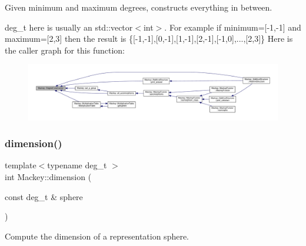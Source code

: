 Given minimum and maximum degrees, constructs everything in between. 

deg\+\_\+t here is usually an std\+::vector$<$int$>$. For example if minimum=\mbox{[}-\/1,-\/1\mbox{]} and maximum=\mbox{[}2,3\mbox{]} then the result is \{\mbox{[}-\/1,-\/1\mbox{]},\mbox{[}0,-\/1\mbox{]},\mbox{[}1,-\/1\mbox{]},\mbox{[}2,-\/1\mbox{]},\mbox{[}-\/1,0\mbox{]},...,\mbox{[}2,3\mbox{]}\} Here is the caller graph for this function\+:\nopagebreak
\begin{figure}[H]
\begin{center}
\leavevmode
\includegraphics[width=350pt]{namespaceMackey_a49fef6f64b67ff118d35ac45b9c92972_icgraph}
\end{center}
\end{figure}
\mbox{\label{namespaceMackey_a6a5d40e69e5628ea84896ee43f4a91fa}} 
\subsubsection{\texorpdfstring{dimension()}{dimension()}}
{\footnotesize\ttfamily template$<$typename deg\+\_\+t $>$ \\
int Mackey\+::dimension (\begin{DoxyParamCaption}\item[{const deg\+\_\+t \&}]{sphere }\end{DoxyParamCaption})\hspace{0.3cm}{\ttfamily [inline]}}



Compute the dimension of a representation sphere. 


